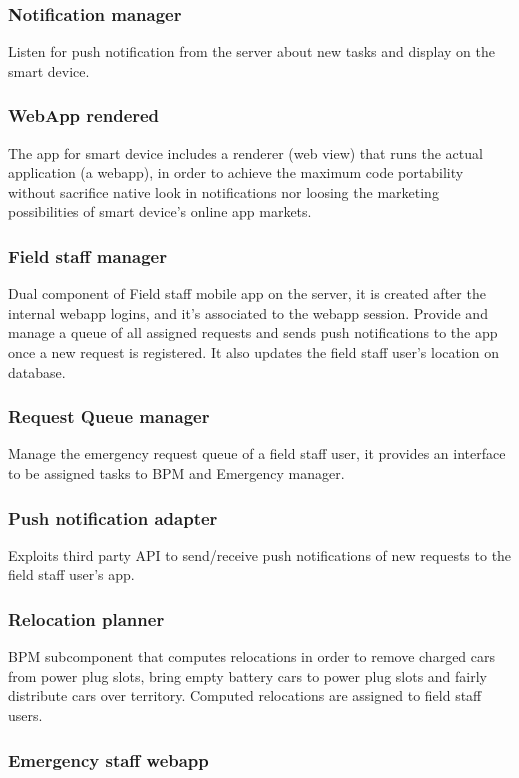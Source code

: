 \documentclass[english]{article}
\begin{document}
		\subsubsection{Notification manager}
		Listen for push notification from the server about new tasks and display on the smart device.
		\subsubsection{WebApp rendered}
		The app for smart device includes a renderer (web view) that runs the actual application (a webapp), in order to achieve the maximum code portability without sacrifice native look in notifications nor loosing the marketing possibilities of smart device's online app markets.
	\subsubsection{Field staff manager}
	Dual component of Field staff mobile app on the server, it is created after the internal webapp logins, and it's associated to the webapp session. Provide and manage a queue of all assigned requests and sends push notifications to the app once a new request is registered. It also updates the field staff user's location on database.
		\subsubsection{Request Queue manager}
		Manage the emergency request queue of a field staff user, it provides an interface to be assigned tasks to BPM and Emergency manager.
	\subsubsection{Push notification adapter}
	Exploits third party API to send/receive push notifications of new requests to the field staff user's app.
	\subsubsection{Relocation planner }
	BPM subcomponent that computes relocations in order to remove charged cars from power plug slots, bring empty battery cars to power plug slots and fairly distribute cars over territory. Computed relocations are assigned to field staff users.
	
	
	
\subsubsection*{Emergency staff webapp}
\end{document}
